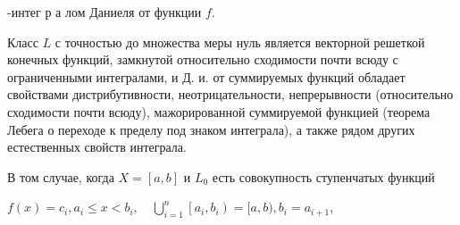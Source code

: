 \documentclass[10pt]{article}
\begin{document}
-интег р а лом Даниеля от функции $f$.



Класс $L$ с точностью до множества меры нуль является векторной решеткой конечных функций, замкнутой относительно сходимости почти всюду с ограниченными интегралами, и Д. и. от суммируемых функций обладает свойствами дистрибутивности, неотрицательности, непрерывности (относительно сходимости почти всюду), мажорированной суммируемой функцией (теорема Лебега о переходе к пределу под знаком интеграла), а также рядом других естественных свойств интеграла.



В том случае, когда $X=[a, b]$ и $L_{0}$ есть совокупность ступенчатых функций



$f(x)=c_{i}, a_{i} \leqslant x<b_{i}, \quad \bigcup_{i=1}^{n}\left[a_{i}, b_{i}\right)=[a, b), b_{i}=a_{i+1}$,
\end{document}
